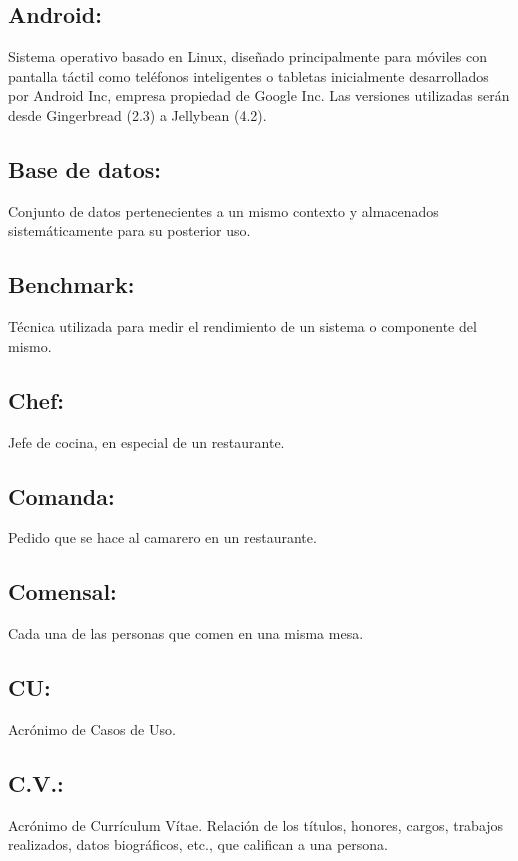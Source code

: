 \documentclass[spanish,a4paper,11pt, twoside]{report}	%
\begin{document}
\newpage
\mbox{}
\thispagestyle{empty}						%
\newpage


\tableofcontents 							%

\newpage
\mbox{}
\thispagestyle{empty}						%
\newpage	



\subsection{Android:} Sistema operativo basado en Linux, diseñado principalmente para móviles con pantalla táctil como teléfonos inteligentes o tabletas inicialmente desarrollados por Android Inc, empresa propiedad de Google Inc. Las versiones utilizadas serán desde Gingerbread (2.3) a Jellybean (4.2).
\subsection{Base de datos:} Conjunto de datos pertenecientes a un mismo contexto y almacenados sistemáticamente para su posterior uso.
\subsection{Benchmark:} Técnica utilizada para medir el rendimiento de un sistema o componente del mismo.
\subsection{Chef:} Jefe de cocina, en especial de un restaurante.
\subsection{Comanda:} Pedido que se hace al camarero en un restaurante.
\subsection{Comensal:} Cada una de las personas que comen en una misma mesa.
\subsection{CU:} Acrónimo de Casos de Uso.
\subsection{C.V.:}Acrónimo de Currículum Vítae. Relación de los títulos, honores, cargos, trabajos realizados, datos biográficos, etc., que califican a una persona.
\end{document}
